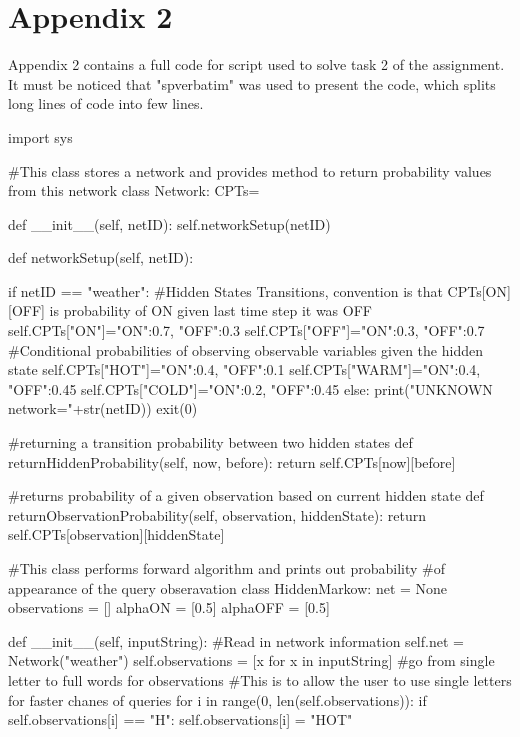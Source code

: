 \documentclass[10pt]{article}
\begin{document}
\newpage
\section{Appendix 2}
Appendix 2 contains a full code for script used to solve task 2 of the assignment. It must be noticed that "spverbatim" was used to present the code, which splits long lines of code into few lines.


\begin{spverbatim}



import sys

#This class stores a network and provides method to return probability values from this network
class Network:
    CPTs={}

    def __init__(self, netID):
        self.networkSetup(netID)		

    def networkSetup(self, netID):
        
        if netID == "weather":
            #Hidden States Transitions, convention is that CPTs[ON][OFF] is probability of ON given last time step it was OFF
            self.CPTs["ON"]={"ON":0.7, "OFF":0.3}
            self.CPTs["OFF"]={"ON":0.3, "OFF":0.7}
            #Conditional probabilities of observing observable variables given the hidden state
            self.CPTs["HOT"]={"ON":0.4, "OFF":0.1}
            self.CPTs["WARM"]={"ON":0.4, "OFF":0.45}
            self.CPTs["COLD"]={"ON":0.2, "OFF":0.45}
        else:
            print("UNKNOWN network="+str(netID))
            exit(0)

    #returning a transition probability between two hidden states
    def returnHiddenProbability(self, now,  before):
        return self.CPTs[now][before]
    
    #returns probability of a given observation based on current hidden state
    def returnObservationProbability(self, observation,  hiddenState):
        return self.CPTs[observation][hiddenState]
        
#This class performs forward algorithm and prints out probability 
#of appearance of the query obseravation 
class HiddenMarkow:
    net = None
    observations = []
    alphaON = [0.5] 
    alphaOFF = [0.5]
    
    def __init__(self, inputString):
        #Read in network information
        self.net = Network("weather")
        self.observations = [x for x in inputString]
        #go from single letter to full words for observations
        #This is to allow the user to use single letters for faster chanes of queries
        for i in range(0,  len(self.observations)):
            if self.observations[i] == "H":
                self.observations[i] = "HOT"
                

\end{spverbatim}
\end{document}
